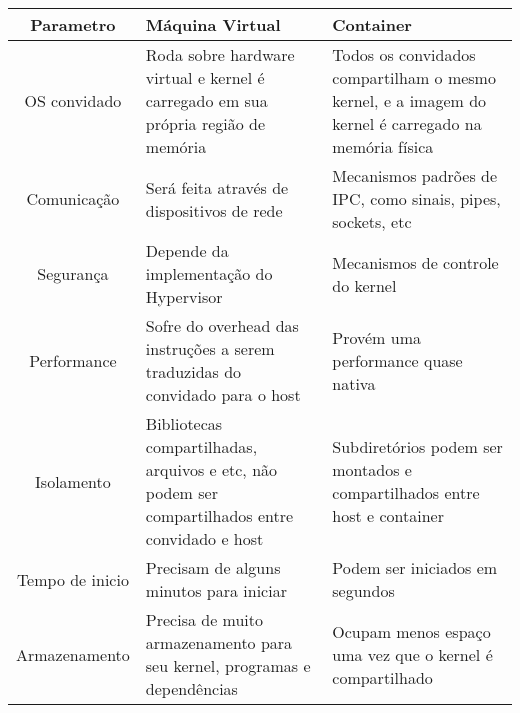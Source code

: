 \begin{tabular}{|c|p{5cm}|p{5cm}|}
\hline
\textbf{Parametro} & \textbf{Máquina Virtual} & \textbf{Container} \\
\hline
OS convidado    & Roda sobre hardware virtual e kernel é carregado em sua própria região de memória & Todos os convidados compartilham o mesmo kernel, e a imagem do kernel é carregado na memória física \\
\hline
Comunicação     & Será feita através de dispositivos de rede & Mecanismos padrões de IPC, como sinais, pipes, sockets, etc \\
\hline
Segurança       & Depende da implementação do Hypervisor & Mecanismos de controle do kernel \\
\hline
Performance     & Sofre do overhead das instruções a serem traduzidas do convidado para o host & Provém uma performance quase nativa \\
\hline
Isolamento      & Bibliotecas compartilhadas, arquivos e etc, não podem ser compartilhados entre convidado e host & Subdiretórios podem ser montados e compartilhados entre host e container \\
\hline
Tempo de inicio & Precisam de alguns minutos para iniciar  &  Podem ser iniciados em segundos \\
\hline
Armazenamento  & Precisa de muito armazenamento para seu kernel, programas e dependências &  Ocupam menos espaço uma vez que o kernel é compartilhado \\
\hline
\end{tabular}

\label{fig:container_vs_virt_t1_vs_virt_t2}